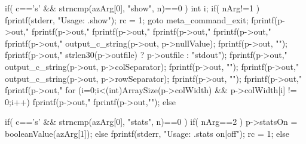 \begin{Codex}[label=shell.c,numbers=left]
{  if( c=='s' && strncmp(azArg[0], "show", n)==0 ){
    int i;
    if( nArg!=1 ){
      fprintf(stderr, "Usage: .show\n");
      rc = 1;
      goto meta_command_exit;
    }
    fprintf(p->out,"%
    fprintf(p->out,"%
    fprintf(p->out,"%
    fprintf(p->out,"%
    fprintf(p->out,"%
    fprintf(p->out,"%
      output_c_string(p->out, p->nullValue);
      fprintf(p->out, "\n");
    fprintf(p->out,"%
            strlen30(p->outfile) ? p->outfile : "stdout");
    fprintf(p->out,"%
      output_c_string(p->out, p->colSeparator);
      fprintf(p->out, "\n");
    fprintf(p->out,"%
      output_c_string(p->out, p->rowSeparator);
      fprintf(p->out, "\n");
    fprintf(p->out,"%
    fprintf(p->out,"%
    for (i=0;i<(int)ArraySize(p->colWidth) && p->colWidth[i] != 0;i++) {
      fprintf(p->out,"%
    }
    fprintf(p->out,"\n");
  }else

  if( c=='s' && strncmp(azArg[0], "stats", n)==0 ){
    if( nArg==2 ){
      p->statsOn = booleanValue(azArg[1]);
    }else{
      fprintf(stderr, "Usage: .stats on|off\n");
      rc = 1;
    }
  }else

}
\end{Codex}
